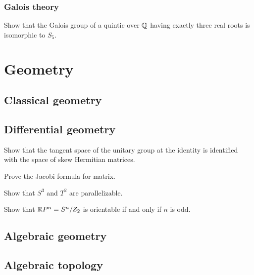 \documentclass[11pt]{report}
\let\realsection\section
\renewcommand\section{\realsection}
\begin{document}
\subsection{Galois theory}
\begin{cond}
\item Show that the Galois group of a quintic over $\mathbb{Q}$ having exactly three real roots is isomorphic to $S_5$.
\end{cond}



\chapter{Geometry}

\section{Classical geometry}

\section{Differential geometry}
\begin{cond}
\item Show that the tangent space of the unitary group at the identity is identified with the space of skew Hermitian matrices.
\item Prove the Jacobi formula for matrix.
\item Show that $S^3$ and $T^2$ are parallelizable.
\item Show that $\mathbb{R} P^n=S^n/Z_2$ is orientable if and only if $n$ is odd.
\end{cond}

\section{Algebraic geometry}

\section{Algebraic topology}
\end{document}
